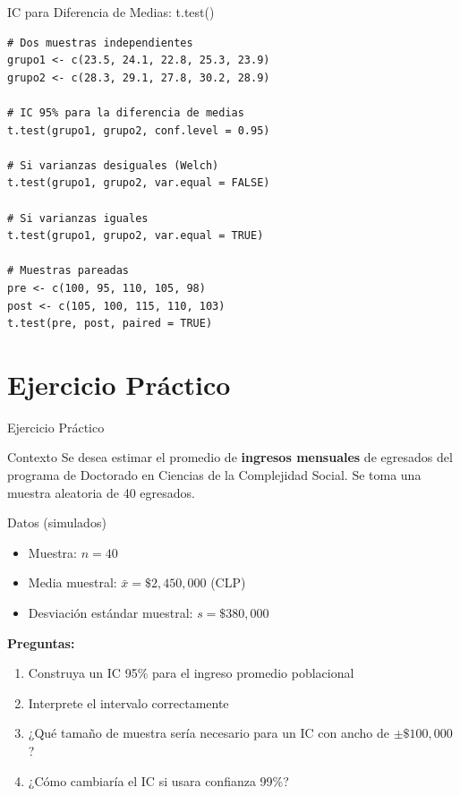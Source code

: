 \documentclass[aspectratio=169,11pt]{beamer}
\begin{document}
\begin{frame}[fragile]{IC para Diferencia de Medias: t.test()}
\begin{lstlisting}
# Dos muestras independientes
grupo1 <- c(23.5, 24.1, 22.8, 25.3, 23.9)
grupo2 <- c(28.3, 29.1, 27.8, 30.2, 28.9)

# IC 95% para la diferencia de medias
t.test(grupo1, grupo2, conf.level = 0.95)

# Si varianzas desiguales (Welch)
t.test(grupo1, grupo2, var.equal = FALSE)

# Si varianzas iguales
t.test(grupo1, grupo2, var.equal = TRUE)

# Muestras pareadas
pre <- c(100, 95, 110, 105, 98)
post <- c(105, 100, 115, 110, 103)
t.test(pre, post, paired = TRUE)
\end{lstlisting}
\end{frame}

\section{Ejercicio Práctico}

\begin{frame}{Ejercicio Práctico}
\begin{block}{Contexto}
Se desea estimar el promedio de \textbf{ingresos mensuales} de egresados del programa de Doctorado en Ciencias de la Complejidad Social. Se toma una muestra aleatoria de 40 egresados.
\end{block}

\pause

\vspace{0.3cm}

\begin{exampleblock}{Datos (simulados)}
\begin{itemize}
  \item Muestra: $n = 40$
  \item Media muestral: $\bar{x} = \$2,450,000$ (CLP)
  \item Desviación estándar muestral: $s = \$380,000$
\end{itemize}
\end{exampleblock}

\pause

\vspace{0.3cm}

\textbf{Preguntas:}
\begin{enumerate}
  \item Construya un IC 95\% para el ingreso promedio poblacional
  \item Interprete el intervalo correctamente
  \item ¿Qué tamaño de muestra sería necesario para un IC con ancho de $\pm\$100,000$?
  \item ¿Cómo cambiaría el IC si usara confianza 99\%?
\end{enumerate}
\end{frame}
\end{document}
